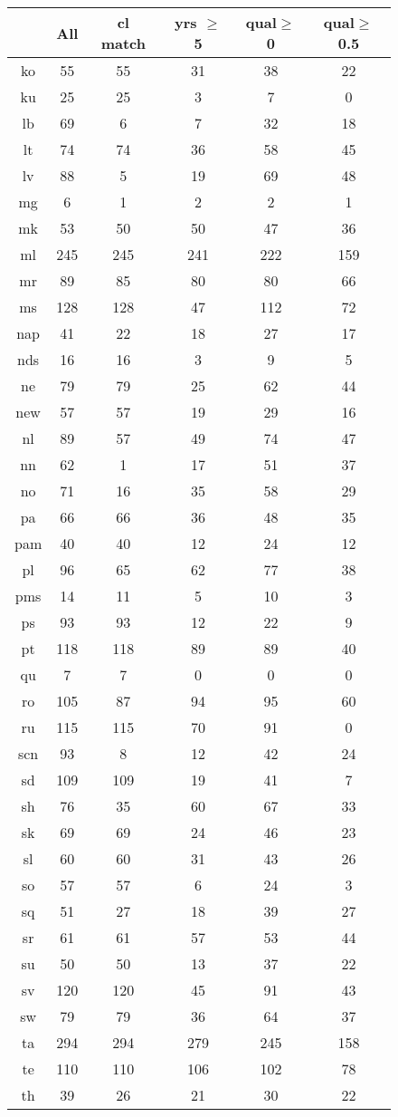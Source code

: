\clearpage
\begin{figure}[h]
\centering
\begin{tabular}{cccccc}
&All&cl match&yrs $\geq$ 5&qual$\geq$0&qual$\geq$0.5\\
\hline\hline
ko&55&55&31&38&22\\
ku&25&25&3&7&0\\
lb&69&6&7&32&18\\
lt&74&74&36&58&45\\
lv&88&5&19&69&48\\
mg&6&1&2&2&1\\
mk&53&50&50&47&36\\
ml&245&245&241&222&159\\
mr&89&85&80&80&66\\
ms&128&128&47&112&72\\
nap&41&22&18&27&17\\
nds&16&16&3&9&5\\
ne&79&79&25&62&44\\
new&57&57&19&29&16\\
nl&89&57&49&74&47\\
nn&62&1&17&51&37\\
no&71&16&35&58&29\\
pa&66&66&36&48&35\\
pam&40&40&12&24&12\\
pl&96&65&62&77&38\\
pms&14&11&5&10&3\\
ps&93&93&12&22&9\\
pt&118&118&89&89&40\\
qu&7&7&0&0&0\\
ro&105&87&94&95&60\\
ru&115&115&70&91&0\\
scn&93&8&12&42&24\\
sd&109&109&19&41&7\\
sh&76&35&60&67&33\\
sk&69&69&24&46&23\\
sl&60&60&31&43&26\\
so&57&57&6&24&3\\
sq&51&27&18&39&27\\
sr&61&61&57&53&44\\
su&50&50&13&37&22\\
sv&120&120&45&91&43\\
sw&79&79&36&64&37\\
ta&294&294&279&245&158\\
te&110&110&106&102&78\\
th&39&26&21&30&22\\

\end{tabular}
\end{figure}
